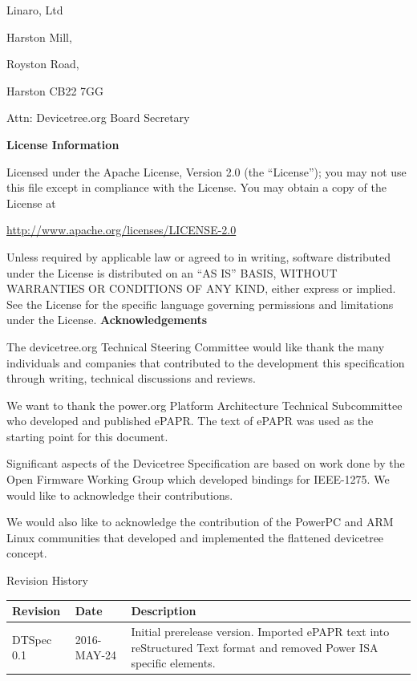 \documentclass[a4paper,10pt,oneside]{sphinxmanual}
\begin{document}
\begin{DUlineblock}{0em}
\item[] Linaro, Ltd
\item[] Harston Mill,
\item[] Royston Road,
\item[] Harston CB22 7GG
\item[] Attn: Devicetree.org Board Secretary
\end{DUlineblock}

\textbf{License Information}

Licensed under the Apache License, Version 2.0 (the ``License'');
you may not use this file except in compliance with the License.
You may obtain a copy of the License at

\url{http://www.apache.org/licenses/LICENSE-2.0}

Unless required by applicable law or agreed to in writing, software
distributed under the License is distributed on an ``AS IS'' BASIS,
WITHOUT WARRANTIES OR CONDITIONS OF ANY KIND, either express or implied.
See the License for the specific language governing permissions and
limitations under the License.
\newpage
\textbf{Acknowledgements}

The devicetree.org Technical Steering Committee would like
thank the many individuals and companies that contributed to the
development this specification through writing, technical discussions
and reviews.

We want to thank the power.org Platform Architecture Technical Subcommittee who
developed and published ePAPR. The text of ePAPR was used as the starting
point for this document.

Significant aspects of the Devicetree Specification are based on work done by
the Open Firmware Working Group which developed bindings for IEEE-1275.
We would like to acknowledge their contributions.

We would also like to acknowledge the contribution of the PowerPC and ARM Linux
communities that developed and implemented the flattened devicetree concept.
\label{revhistory:revision-history}

\begin{threeparttable}
\capstart\caption{Revision History}\label{revhistory:id1}
\begin{tabulary}{\linewidth}{| l l J |}
\hline
\textsf{\relax 
Revision
} & \textsf{\relax 
Date
} & \textsf{\relax 
Description
}\\
\hline
DTSpec 0.1
 & 
2016-MAY-24
 & 
Initial prerelease version. Imported ePAPR text
into reStructured Text format and removed Power ISA
specific elements.
\\
\hline\end{tabulary}

\end{threeparttable}
\end{document}
